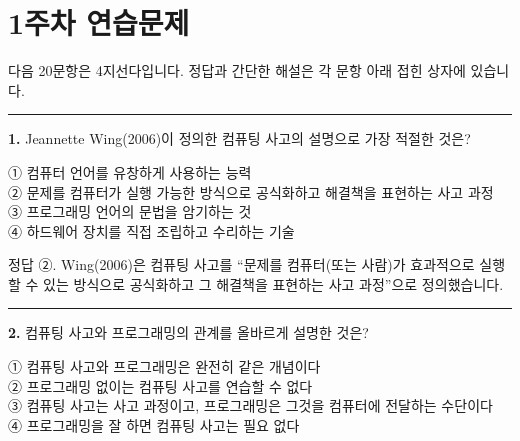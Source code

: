 \documentclass[
  korean,
  11pt,
  a4paper,
  DIV=11,
  numbers=noendperiod]{scrreprt}
\begin{document}

\chapter{1주차 연습문제}\label{sec-ch1-quiz}

다음 20문항은 4지선다입니다. 정답과 간단한 해설은 각 문항 아래 접힌
상자에 있습니다.

\begin{center}\rule{0.5\linewidth}{0.5pt}\end{center}

\textbf{1.} Jeannette Wing(2006)이 정의한 컴퓨팅 사고의 설명으로 가장
적절한 것은?

① 컴퓨터 언어를 유창하게 사용하는 능력\\
② 문제를 컴퓨터가 실행 가능한 방식으로 공식화하고 해결책을 표현하는 사고
과정\\
③ 프로그래밍 언어의 문법을 암기하는 것\\
④ 하드웨어 장치를 직접 조립하고 수리하는 기술

\begin{tcolorbox}[enhanced jigsaw, arc=.35mm, bottomrule=.15mm, bottomtitle=1mm, breakable, colback=white, colbacktitle=quarto-callout-note-color!10!white, colframe=quarto-callout-note-color-frame, coltitle=black, left=2mm, leftrule=.75mm, opacityback=0, opacitybacktitle=0.6, rightrule=.15mm, title=\textcolor{quarto-callout-note-color}{\faInfo}\hspace{0.5em}{노트}, titlerule=0mm, toprule=.15mm, toptitle=1mm]

정답 ②. Wing(2006)은 컴퓨팅 사고를 ``문제를 컴퓨터(또는 사람)가
효과적으로 실행할 수 있는 방식으로 공식화하고 그 해결책을 표현하는 사고
과정''으로 정의했습니다.

\end{tcolorbox}

\begin{center}\rule{0.5\linewidth}{0.5pt}\end{center}

\textbf{2.} 컴퓨팅 사고와 프로그래밍의 관계를 올바르게 설명한 것은?

① 컴퓨팅 사고와 프로그래밍은 완전히 같은 개념이다\\
② 프로그래밍 없이는 컴퓨팅 사고를 연습할 수 없다\\
③ 컴퓨팅 사고는 사고 과정이고, 프로그래밍은 그것을 컴퓨터에 전달하는
수단이다\\
④ 프로그래밍을 잘 하면 컴퓨팅 사고는 필요 없다
\end{document}
